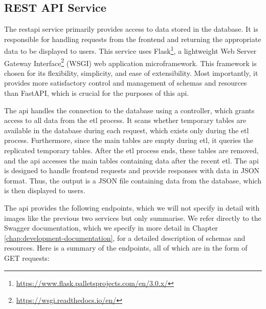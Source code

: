 \subsection{REST API Service}
\label{subsec:architecture-rest-api}
The \acrshort{restapi} service primarily provides access to data stored in the database. It is responsible for handling requests from the frontend and returning the appropriate data to be displayed to users. This service uses Flask\footnote{\href{https://www.flask.palletsprojects.com/en/3.0.x/}{https://www.flask.palletsprojects.com/en/3.0.x/}}, a lightweight Web Server Gateway Interface\footnote{\href{https://wsgi.readthedocs.io/en/}{https://wsgi.readthedocs.io/en/}} (WSGI) web application microframework. This framework is chosen for its flexibility, simplicity, and ease of extensibility. Most importantly, it provides more satisfactory control and management of schemas and resources than FastAPI, which is crucial for the purposes of this \acrshort{api}.

The \acrshort{api} handles the connection to the database using a controller, which grants access to all data from the \acrshort{etl} process. It scans whether temporary tables are available in the database during each request, which exists only during the \acrshort{etl} process. Furthermore, since the main tables are empty during \acrshort{etl}, it queries the replicated temporary tables. After the \acrshort{etl} process ends, these tables are removed, and the \acrshort{api} accesses the main tables containing data after the recent \acrshort{etl}. The \acrshort{api} is designed to handle frontend requests and provide responses with data in JSON format. Thus, the output is a JSON file containing data from the database, which is then displayed to users.

The \acrshort{api} provides the following endpoints, which we will not specify in detail with images like the previous two services but only summarise. We refer directly to the Swagger documentation, which we specify in more detail in Chapter \ref{chap:development-documentation}, for a detailed description of schemas and resources. Here is a summary of the endpoints, all of which are in the form of GET requests:


